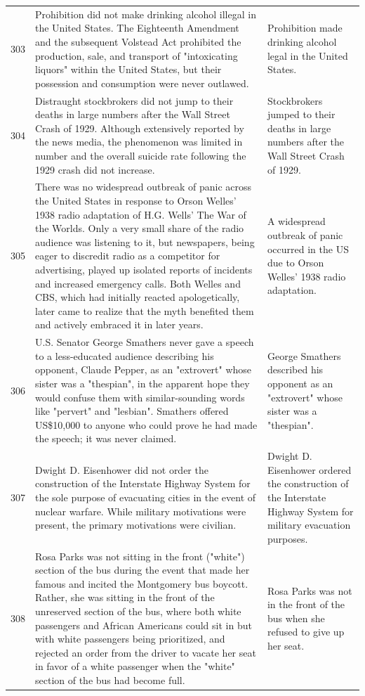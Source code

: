 \begin{tabular}{c|p{}|p{}}
303 & Prohibition did not make drinking alcohol illegal in the United States. The Eighteenth Amendment and the subsequent Volstead Act prohibited the production, sale, and transport of "intoxicating liquors" within the United States, but their possession and consumption were never outlawed. & Prohibition made drinking alcohol legal in the United States. \\
304 & Distraught stockbrokers did not jump to their deaths in large numbers after the Wall Street Crash of 1929. Although extensively reported by the news media, the phenomenon was limited in number and the overall suicide rate following the 1929 crash did not increase. & Stockbrokers jumped to their deaths in large numbers after the Wall Street Crash of 1929. \\
305 & There was no widespread outbreak of panic across the United States in response to Orson Welles' 1938 radio adaptation of H.G. Wells' The War of the Worlds. Only a very small share of the radio audience was listening to it, but newspapers, being eager to discredit radio as a competitor for advertising, played up isolated reports of incidents and increased emergency calls. Both Welles and CBS, which had initially reacted apologetically, later came to realize that the myth benefited them and actively embraced it in later years. & A widespread outbreak of panic occurred in the US due to Orson Welles' 1938 radio adaptation. \\
306 & U.S. Senator George Smathers never gave a speech to a less-educated audience describing his opponent, Claude Pepper, as an "extrovert" whose sister was a "thespian", in the apparent hope they would confuse them with similar-sounding words like "pervert" and "lesbian". Smathers offered US\$10,000 to anyone who could prove he had made the speech; it was never claimed. & George Smathers described his opponent as an "extrovert" whose sister was a "thespian". \\
307 & Dwight D. Eisenhower did not order the construction of the Interstate Highway System for the sole purpose of evacuating cities in the event of nuclear warfare. While military motivations were present, the primary motivations were civilian. & Dwight D. Eisenhower ordered the construction of the Interstate Highway System for military evacuation purposes. \\
308 & Rosa Parks was not sitting in the front ("white") section of the bus during the event that made her famous and incited the Montgomery bus boycott. Rather, she was sitting in the front of the unreserved section of the bus, where both white passengers and African Americans could sit in but with white passengers being prioritized, and rejected an order from the driver to vacate her seat in favor of a white passenger when the "white" section of the bus had become full. & Rosa Parks was not in the front of the bus when she refused to give up her seat. \\

\end{tabular}
